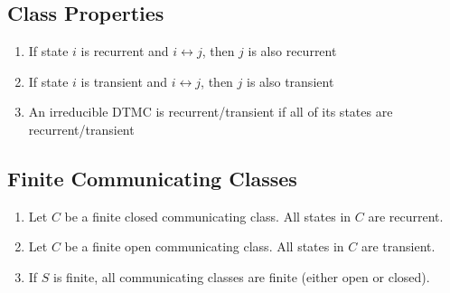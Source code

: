 \documentclass[12pt]{article}
\begin{document}
\subsection*{Class Properties}
\begin{enumerate}
    \item If state $i$ is recurrent and $i \leftrightarrow j$, then $j$ is also recurrent
    \item If state $i$ is transient and $i \leftrightarrow j$, then $j$ is also transient
    \item An irreducible DTMC is recurrent/transient if all of its states are recurrent/transient
\end{enumerate}

\subsection*{Finite Communicating Classes}
\begin{enumerate}
    \item Let $C$ be a finite closed communicating class. All states in $C$ are recurrent.
    \item Let $C$ be a finite open communicating class. All states in $C$ are transient.
    \item If $S$ is finite, all communicating classes are finite (either open or closed).
\end{enumerate}
\end{document}
